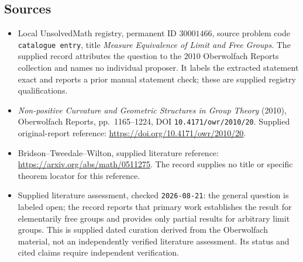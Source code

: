 \documentclass[11pt]{article}
\begin{document}
\subsection{Sources}
\begin{itemize}
\item Local UnsolvedMath registry, permanent ID \(30001466\), source problem code \texttt{catalogue entry}, title \emph{Measure Equivalence of Limit and Free Groups}. The supplied record attributes the question to the 2010 Oberwolfach Reports collection and names no individual proposer. It labels the extracted statement exact and reports a prior manual statement check; these are supplied registry qualifications.
\item \emph{Non-positive Curvature and Geometric Structures in Group Theory} (2010), Oberwolfach Reports, pp.\ 1165--1224, DOI \texttt{10.4171/owr/2010/20}. Supplied original-report reference: \url{https://doi.org/10.4171/owr/2010/20}.
\item Bridson--Tweedale--Wilton, supplied literature reference: \url{https://arxiv.org/abs/math/0511275}. The record supplies no title or specific theorem locator for this reference.
\item Supplied literature assessment, checked \texttt{2026-08-21}: the general question is labeled open; the record reports that primary work establishes the result for elementarily free groups and provides only partial results for arbitrary limit groups. This is supplied dated curation derived from the Oberwolfach material, not an independently verified literature assessment. Its status and cited claims require independent verification.
\end{itemize}
\end{document}
